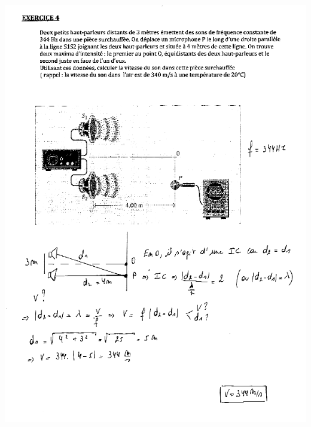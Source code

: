 {\includegraphics[width=18.253cm,height=25.273cm]{Pictures/100000010000027000000360FFD6C2C9381DA208.png}

}
